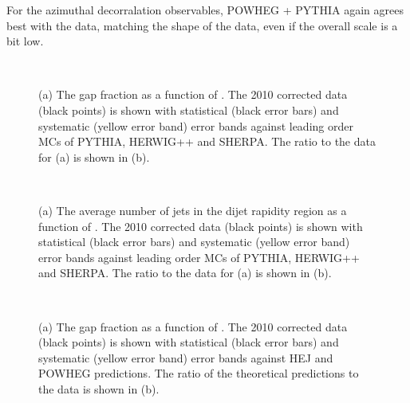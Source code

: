 For the azimuthal decorralation observables, POWHEG + PYTHIA again agrees best with the data, matching the shape of the data, even if the overall scale is a bit low.


\begin{figure}
\centering
\mbox{
              \quad
              \quad
                              }
\caption[]{
(a) The gap fraction as a function of \dy{}.  
The 2010 corrected data (black points) is shown with statistical (black error bars) and systematic (yellow error band) error bands against leading order MCs of PYTHIA, HERWIG++ and SHERPA.
The ratio to the data for (a)  is shown in (b).
\label{GBJ2:FinalPlots:GapFracLO}}
\end{figure}

\begin{figure}
\centering
\mbox{
              \quad
              \quad
                              }
\caption[]{
(a) The average number of jets in the dijet rapidity region as a function of \dy{}.  
The 2010 corrected data (black points) is shown with statistical (black error bars) and systematic (yellow error band) error bands against leading order MCs of PYTHIA, HERWIG++ and SHERPA.
The ratio to the data for (a) is shown in (b).
\label{GBJ2:FinalPlots:NJetLO}}
\end{figure}

\begin{figure}
\centering
\mbox{
              \quad
              \quad
                              }
\caption[]{
(a) The gap fraction as a function of \dy{}.  
The 2010 corrected data (black points) is shown with statistical (black error bars) and systematic (yellow error band) error bands against HEJ and POWHEG predictions.
The ratio of the theoretical predictions to the data is shown in (b).
\label{GBJ2:FinalPlots:GapFrac}}
\end{figure}



